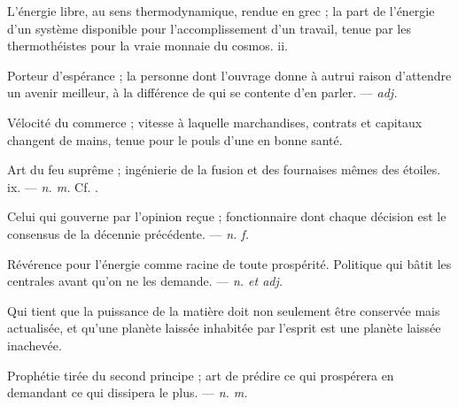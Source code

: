  L'énergie libre, au sens thermodynamique, rendue en grec ; la part de l'énergie d'un système disponible pour l'accomplissement d'un travail, tenue par les thermothéistes pour la vraie monnaie du cosmos.   ii.

 Porteur d'espérance ; la personne dont l'ouvrage donne à autrui raison d'attendre un avenir meilleur, à la différence de qui se contente d'en parler. ---  \textit{adj.}

 Vélocité du commerce ; vitesse à laquelle marchandises, contrats et capitaux changent de mains, tenue pour le pouls d'une  en bonne santé.

 Art du feu suprême ; ingénierie de la fusion et des fournaises mêmes des étoiles.   ix. ---  \textit{n. m.} Cf. .

 Celui qui gouverne par l'opinion reçue ; fonctionnaire dont chaque décision est le consensus de la décennie précédente. ---  \textit{n. f.}

  Révérence pour l'énergie comme racine de toute prospérité.  Politique qui bâtit les centrales avant qu'on ne les demande. ---  \textit{n. et adj.}

 Qui tient que la puissance de la matière doit non seulement être conservée mais actualisée, et qu'une planète laissée inhabitée par l'esprit est une planète laissée inachevée.

 Prophétie tirée du second principe ; art de prédire ce qui prospérera en demandant ce qui dissipera le plus. ---  \textit{n. m.}

